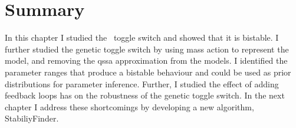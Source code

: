 \clearpage
\section{Summary}

In this chapter I studied the~\textcite{Gardner:2000vha} toggle switch and showed that it is bistable. I further studied the genetic toggle switch by using mass action to represent the model, and removing the \acrshort{qssa} approximation from the models. I identified the parameter ranges that produce a bistable behaviour and could be used as prior distributions for parameter inference. Further, I studied the effect of adding feedback loops has on the robustness of the genetic toggle switch. In the next chapter I address these shortcomings by developing a new algorithm, StabiliyFinder. 



